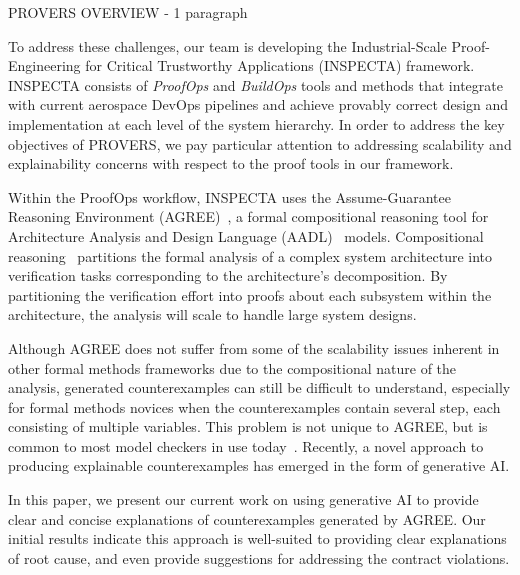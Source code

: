 PROVERS OVERVIEW - 1 paragraph

To address these challenges, our team is developing the Industrial-Scale Proof-Engineering for Critical Trustworthy Applications (INSPECTA) framework.  INSPECTA consists of \textit{ProofOps} and \textit{BuildOps} tools and methods that integrate with current aerospace DevOps pipelines and achieve provably correct design and implementation at each level of the system hierarchy.  In order to address the key objectives of PROVERS, we pay particular attention to addressing scalability and explainability concerns with respect to the proof tools in our framework.

Within the ProofOps workflow, INSPECTA uses the Assume-Guarantee Reasoning Environment (AGREE)~\cite{}, a formal compositional reasoning tool for Architecture Analysis and Design Language (AADL)~\cite{} models.
Compositional reasoning~\cite{} partitions the formal analysis of a complex system architecture into verification tasks corresponding to the architecture's decomposition.  By partitioning the verification effort into proofs about each subsystem within the architecture, the analysis will scale to handle large system designs.

Although AGREE does not suffer from some of the scalability issues inherent in other formal methods frameworks due to the compositional nature of the analysis, generated counterexamples can still be difficult to understand, especially for formal methods novices when the counterexamples contain several step, each consisting of multiple variables.  This problem is not unique to AGREE, but is common to most model checkers in use today~\cite{}.  Recently, a novel approach to producing explainable counterexamples has emerged in the form of generative AI.

In this paper, we present our current work on using generative AI to provide clear and concise explanations of counterexamples generated by AGREE.  Our initial results indicate this approach is well-suited to providing clear explanations of root cause, and even provide suggestions for addressing the contract violations.